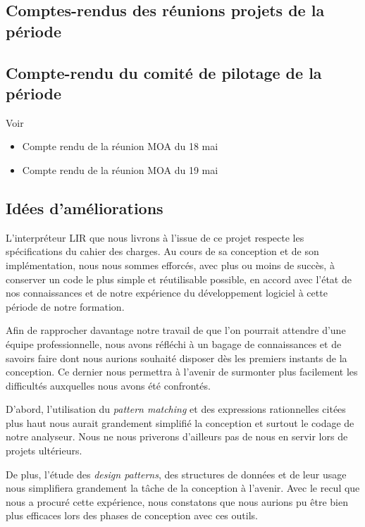 \documentclass[12pt,a4paper,titlepage,openany, oneside]{report}
\begin{document}
    \subsection{Comptes-rendus des réunions projets de la période}

    \subsection{Compte-rendu du comité de pilotage de la période}
        Voir
        \begin{itemize}
            \item Compte rendu de la réunion MOA du 18 mai
            \item Compte rendu de la réunion MOA du 19 mai
        \end{itemize}

    \subsection{Idées d'améliorations}
        L'interpréteur LIR que nous livrons à l'issue de ce projet respecte les
        spécifications du cahier des charges. Au cours de sa conception et de son implémentation, nous nous
        sommes efforcés, avec plus ou moins de succès, à conserver un code le plus
        simple et réutilisable possible, en accord avec l'état de nos connaissances et
        de notre expérience du développement logiciel à cette période de notre formation.

        Afin de rapprocher davantage notre travail de que l'on pourrait attendre d'une
        équipe professionnelle, nous avons réfléchi à un bagage de connaissances et de
        savoirs faire dont nous aurions souhaité disposer dès les premiers instants de la
        conception. Ce dernier nous permettra à l'avenir de surmonter plus facilement
        les difficultés auxquelles nous avons été confrontés.

        D'abord, l'utilisation du \emph{pattern matching} et des expressions
        rationnelles citées plus haut nous aurait grandement simplifié la conception et
        surtout le codage de notre analyseur. Nous ne nous priverons d'ailleurs pas de
        nous en servir lors de projets ultérieurs.

        De plus, l'étude des \emph{design patterns}, des structures de données et de leur
        usage nous simplifiera grandement la tâche de la conception à l'avenir. Avec le
        recul que nous a procuré cette expérience, nous constatons que nous aurions
        pu être bien plus efficaces lors des phases de conception avec ces outils.
\end{document}
